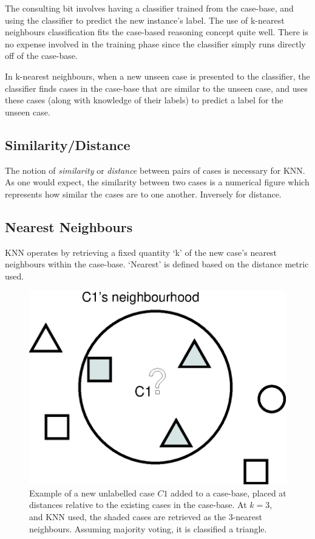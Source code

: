 \documentclass[a4paper,11pt]{report}
\begin{document}
The consulting bit involves having a classifier trained from the case-base, and using the classifier to predict the new instance's label. The use of k-nearest neighbours classification fits the case-based reasoning concept quite well. There is no expense involved in the training phase since the classifier simply runs directly off of the case-base.

In k-nearest neighbours, when a new unseen case is presented to the classifier, the classifier finds cases in the case-base that are similar to the unseen case, and uses these cases (along with knowledge of their labels) to predict a label for the unseen case.

\subsection{Similarity/Distance}

The notion of \emph{similarity} or \emph{distance} between pairs of cases is necessary for KNN. As one would expect, the similarity between two cases is a numerical figure which represents how similar the cases are to one another. Inversely for distance.

\subsection{Nearest Neighbours}

KNN operates by retrieving a fixed quantity `k' of the new case's nearest neighbours within the case-base. `Nearest' is defined based on the distance metric used.

\begin{figure}[h!] 
\centering
\includegraphics[scale=0.5]{./Drawn/KnnExample}
\caption{Example of a new unlabelled case $C1$ added to a case-base, placed at distances relative to the existing cases in the case-base. At $k=3$, and KNN used, the shaded cases are retrieved as the 3-nearest neighbours. Assuming majority voting, it is classified a triangle.}
\label{fig:knnexample}
\end{figure}
\end{document}
